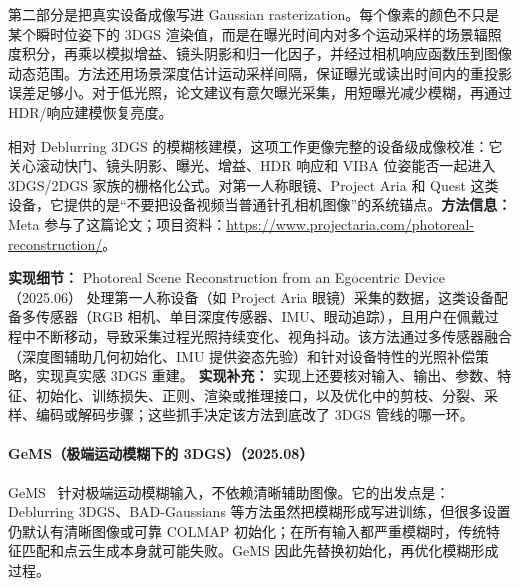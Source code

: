 第二部分是把真实设备成像写进 Gaussian rasterization。每个像素的颜色不只是某个瞬时位姿下的 3DGS 渲染值，而是在曝光时间内对多个运动采样的场景辐照度积分，再乘以模拟增益、镜头阴影和归一化因子，并经过相机响应函数压到图像动态范围。方法还用场景深度估计运动采样间隔，保证曝光或读出时间内的重投影误差足够小。对于低光照，论文建议有意欠曝光采集，用短曝光减少模糊，再通过 HDR/响应建模恢复亮度。

相对 Deblurring 3DGS 的模糊核建模，这项工作更像完整的设备级成像校准：它关心滚动快门、镜头阴影、曝光、增益、HDR 响应和 VIBA 位姿能否一起进入 3DGS/2DGS 家族的栅格化公式。对第一人称眼镜、Project Aria 和 Quest 这类设备，它提供的是“不要把设备视频当普通针孔相机图像”的系统锚点。\textbf{方法信息：} Meta 参与了这篇论文；项目资料：\url{https://www.projectaria.com/photoreal-reconstruction/}。

\textbf{实现细节：} Photoreal Scene Reconstruction from an Egocentric Device（2025.06） 处理第一人称设备（如 Project Aria 眼镜）采集的数据，这类设备配备多传感器（RGB 相机、单目深度传感器、IMU、眼动追踪），且用户在佩戴过程中不断移动，导致采集过程光照持续变化、视角抖动。该方法通过多传感器融合（深度图辅助几何初始化、IMU 提供姿态先验）和针对设备特性的光照补偿策略，实现真实感 3DGS 重建。
\textbf{实现补充：} 实现上还要核对输入、输出、参数、特征、初始化、训练损失、正则、渲染或推理接口，以及优化中的剪枝、分裂、采样、编码或解码步骤；这些抓手决定该方法到底改了 3DGS 管线的哪一环。
\paragraph{GeMS（极端运动模糊下的 3DGS）（2025.08）}
GeMS~\cite{2508_14682} 针对极端运动模糊输入，不依赖清晰辅助图像。它的出发点是：Deblurring 3DGS、BAD-Gaussians 等方法虽然把模糊形成写进训练，但很多设置仍默认有清晰图像或可靠 COLMAP 初始化；在所有输入都严重模糊时，传统特征匹配和点云生成本身就可能失败。GeMS 因此先替换初始化，再优化模糊形成过程。

